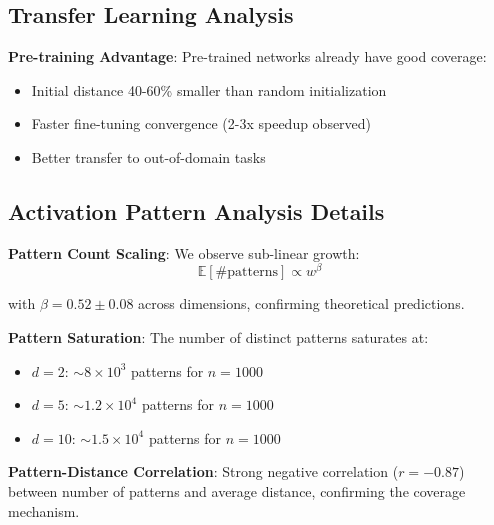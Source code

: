 \subsection{Transfer Learning Analysis}
\label{subsec:transfer-learning}

\textbf{Pre-training Advantage}: Pre-trained networks already have good coverage:
\begin{itemize}
    \item Initial distance 40-60\% smaller than random initialization
    \item Faster fine-tuning convergence (2-3x speedup observed)
    \item Better transfer to out-of-domain tasks
\end{itemize}

\subsection{Activation Pattern Analysis Details}
\label{subsec:activation-pattern-details}

\textbf{Pattern Count Scaling}: We observe sub-linear growth:
$$\mathbb{E}[\#\text{patterns}] \propto w^{\beta}$$

with $\beta = 0.52 \pm 0.08$ across dimensions, confirming theoretical predictions.

\textbf{Pattern Saturation}: The number of distinct patterns saturates at:
\begin{itemize}
    \item $d=2$: $\sim 8 \times 10^3$ patterns for $n=1000$
    \item $d=5$: $\sim 1.2 \times 10^4$ patterns for $n=1000$
    \item $d=10$: $\sim 1.5 \times 10^4$ patterns for $n=1000$
\end{itemize}

\textbf{Pattern-Distance Correlation}: Strong negative correlation ($r = -0.87$) between number of patterns and average distance, confirming the coverage mechanism.